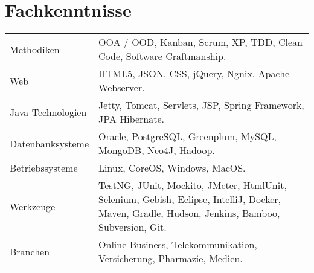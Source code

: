 \section*{Fachkenntnisse}
\begin{longtable}{@{}p{6cm}p{10cm}}
Methodiken	        & OOA / OOD, Kanban, Scrum, XP, TDD, Clean Code, Software Craftmanship.\\
Web         	    & HTML5, JSON, CSS, jQuery, Ngnix, Apache Webserver.\\
Java Technologien	& Jetty, Tomcat, Servlets, JSP, Spring Framework, JPA Hibernate.\\
Datenbanksysteme	& Oracle, PostgreSQL, Greenplum, MySQL, MongoDB, Neo4J, Hadoop.\\
Betriebssysteme	    & Linux, CoreOS, Windows, MacOS.\\
Werkzeuge		    & TestNG, JUnit, Mockito, JMeter, HtmlUnit, Selenium, Gebish, Eclipse, IntelliJ, Docker, Maven, Gradle, Hudson, Jenkins, Bamboo, Subversion, Git.\\
Branchen		    & Online Business, Telekommunikation, Versicherung, Pharmazie, Medien.\\
\end{longtable}
